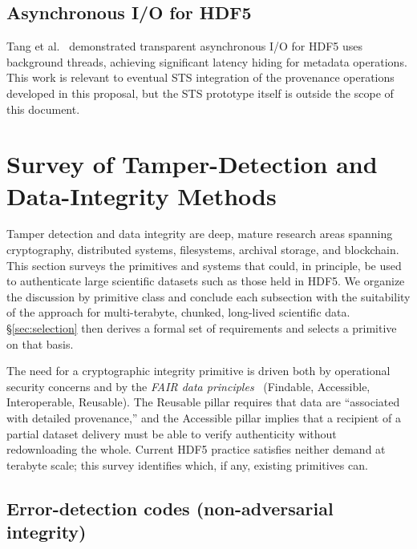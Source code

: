 \documentclass[11pt]{article}
\begin{document}
\subsection{Asynchronous I/O for HDF5}

Tang et al.~\cite{tang2022async} demonstrated transparent asynchronous I/O for
HDF5 uses background threads, achieving significant latency hiding for
metadata operations. This work is relevant to eventual STS integration of the
provenance operations developed in this proposal, but the STS prototype itself
is outside the scope of this document.

\section{Survey of Tamper-Detection and Data-Integrity Methods}
\label{sec:survey}

Tamper detection and data integrity are deep, mature research areas spanning
cryptography, distributed systems, filesystems, archival storage, and
blockchain. This section surveys the primitives and systems that could, in
principle, be used to authenticate large scientific datasets such as those
held in HDF5. We organize the discussion by primitive class and conclude
each subsection with the suitability of the approach for multi-terabyte,
chunked, long-lived scientific data. \S\ref{sec:selection} then derives a
formal set of requirements and selects a primitive on that basis.

The need for a cryptographic integrity primitive is driven both by operational
security concerns and by the \emph{FAIR data principles}~\cite{wilkinson2016fair}
(Findable, Accessible, Interoperable, Reusable). The Reusable pillar requires
that data are ``associated with detailed provenance,'' and the Accessible
pillar implies that a recipient of a partial dataset delivery must be able to
verify authenticity without redownloading the whole. Current HDF5 practice
satisfies neither demand at terabyte scale; this survey identifies which, if
any, existing primitives can.

\subsection{Error-detection codes (non-adversarial integrity)}
\end{document}
